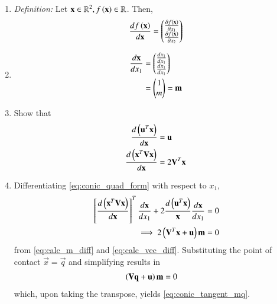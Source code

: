 \renewcommand{\theequation}{\theenumi}
\begin{enumerate}[label=\thesection.\arabic*.,ref=\thesection.\theenumi]
\item {\em Definition: }Let $\mathbf{x} \in \mathbb{R}^2, f\left(\mathbf{x}\right) \in \mathbb{R}$.  Then, 
\begin{align}
\frac{df\left(\mathbf{x}\right)}{d\mathbf{x}} = \begin{pmatrix}\frac{\partial f(\mathbf{x})}{\partial x_1}\\\frac{\partial f(\mathbf{x})}{\partial x_2}\end{pmatrix}
\end{align}
\item 
\begin{align}
\begin{split}
\frac{d\mathbf{x}}{dx_1} &= \begin{pmatrix}\frac{dx_1}{dx_1} \\ \frac{dx_1}{dx_1}\end{pmatrix} 
\\
&= \begin{pmatrix}1\\m\end{pmatrix} = \mathbf{m}
\end{split}
\label{eq:calc_m_diff}
\end{align}
\item Show that 
\begin{align}
\begin{split}
\frac{d\left(\mathbf{u}^T\mathbf{x}\right)}{d\mathbf{x}} &= \mathbf{u}
\\
\frac{d\left(\mathbf{x}^T\mathbf{V}\mathbf{x}\right)}{d\mathbf{x}} &= 2\mathbf{V}^T\mathbf{x}
\end{split}
\label{eq:calc_vec_diff}
\end{align}
\item Differentiating \eqref{eq:conic_quad_form}
with respect to $x_1$,
%
\begin{align}
\label{eq:ellipse_tangent_der}
{}\left[\frac{d\left(\mathbf{x}^T\mathbf{V}\mathbf{x}\right)}{d\mathbf{x}}\right]^T\frac{d\mathbf{x}}{dx_1}
+2\frac{d\left(\mathbf{u}^T\mathbf{x}\right)}{\mathbf{x}} \frac{d\mathbf{x}}{dx_1}
= 0
\\
\implies 2\left(\mathbf{V}^T\mathbf{x}+\mathbf{u}\right)\mathbf{m}  = 0  
\end{align}
from \eqref{eq:calc_m_diff} and \eqref{eq:calc_vec_diff}.
%
Substituting  the point of contact $\vec{x} = \vec{q}$ and simplifying results in
\begin{align}
\left(\mathbf{V}\mathbf{q}+\mathbf{u}\right)\mathbf{m} & = 0 
\label{eq:ellipse_tangent_der_std}
\end{align}
%
which, upon taking the transpose, yields 
\eqref{eq:conic_tangent_mq}.
\end{enumerate}
